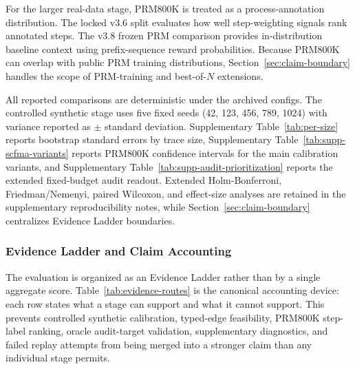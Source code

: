 \documentclass[a4paper,fleqn]{cas-sc}
\begin{document}
For the larger real-data stage, PRM800K is treated as a process-annotation distribution. The locked v3.6 split evaluates how well step-weighting signals rank annotated steps. The v3.8 frozen PRM comparison provides in-distribution baseline context using prefix-sequence reward probabilities. Because PRM800K can overlap with public PRM training distributions, Section~\ref{sec:claim-boundary} handles the scope of PRM-training and best-of-$N$ extensions.

All reported comparisons are deterministic under the archived configs. The controlled synthetic stage uses five fixed seeds (42, 123, 456, 789, 1024) with variance reported as $\pm$ standard deviation. Supplementary Table~\ref{tab:per-size} reports bootstrap standard errors by trace size, Supplementary Table~\ref{tab:supp-scfma-variants} reports PRM800K confidence intervals for the main calibration variants, and Supplementary Table~\ref{tab:supp-audit-prioritization} reports the extended fixed-budget audit readout. Extended Holm-Bonferroni, Friedman/Nemenyi, paired Wilcoxon, and effect-size analyses are retained in the supplementary reproducibility notes, while Section~\ref{sec:claim-boundary} centralizes Evidence Ladder boundaries.

\subsubsection{Evidence Ladder and Claim Accounting}

The evaluation is organized as an Evidence Ladder rather than by a single aggregate score. Table~\ref{tab:evidence-routes} is the canonical accounting device: each row states what a stage can support and what it cannot support. This prevents controlled synthetic calibration, typed-edge feasibility, PRM800K step-label ranking, oracle audit-target validation, supplementary diagnostics, and failed replay attempts from being merged into a stronger claim than any individual stage permits.
\end{document}
